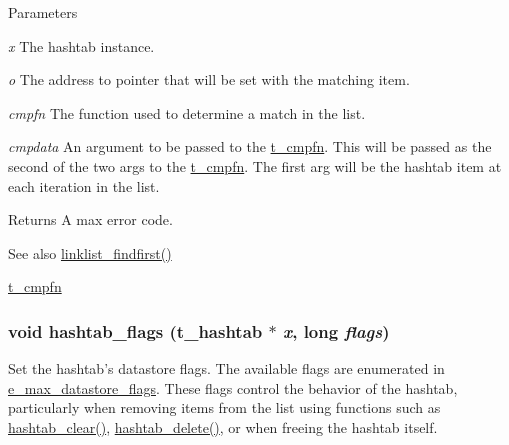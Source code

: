 \begin{DoxyParams}{Parameters}
\item[{\em x}]The hashtab instance. \item[{\em o}]The address to pointer that will be set with the matching item. \item[{\em cmpfn}]The function used to determine a match in the list. \item[{\em cmpdata}]An argument to be passed to the \hyperlink{group__datastore_gaaf4ae6dd800a2be9abd645cf70aeb38f}{t\_\-cmpfn}. This will be passed as the second of the two args to the \hyperlink{group__datastore_gaaf4ae6dd800a2be9abd645cf70aeb38f}{t\_\-cmpfn}. The first arg will be the hashtab item at each iteration in the list. \end{DoxyParams}
\begin{DoxyReturn}{Returns}
A max error code.
\end{DoxyReturn}
\begin{DoxySeeAlso}{See also}
\hyperlink{group__linklist_gab7f3c26cb704c460892818b89a1ab004}{linklist\_\-findfirst()} 

\hyperlink{group__datastore_gaaf4ae6dd800a2be9abd645cf70aeb38f}{t\_\-cmpfn} 
\end{DoxySeeAlso}
\hypertarget{group__hashtab_gaaaefb350afdfdbe1440dd6401ac56eb7}{
\subsubsection[{hashtab\_\-flags}]{\setlength{\rightskip}{0pt plus 5cm}void hashtab\_\-flags ({\bf t\_\-hashtab} $\ast$ {\em x}, \/  long {\em flags})}}
\label{group__hashtab_gaaaefb350afdfdbe1440dd6401ac56eb7}


Set the hashtab's datastore flags. The available flags are enumerated in \hyperlink{group__datastore_gaa858d4b3815076d79624c39d9ca59348}{e\_\-max\_\-datastore\_\-flags}. These flags control the behavior of the hashtab, particularly when removing items from the list using functions such as \hyperlink{group__hashtab_gae7984db2865416d6da6ce20c76975321}{hashtab\_\-clear()}, \hyperlink{group__hashtab_gadc3b33bd84f054f9a725b87e809779fc}{hashtab\_\-delete()}, or when freeing the hashtab itself.


